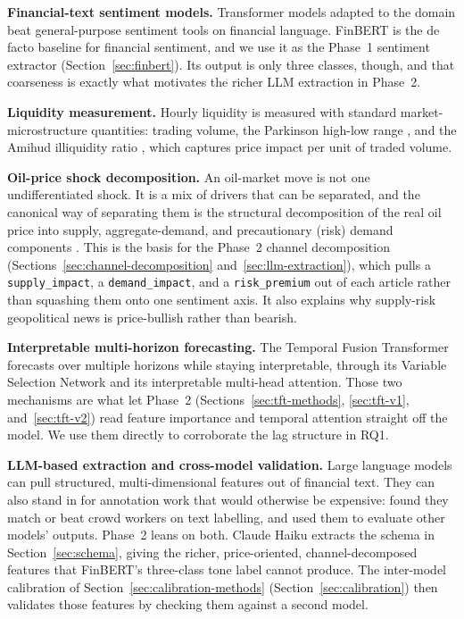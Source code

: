 \textbf{Financial-text sentiment models.} Transformer models adapted to the domain beat general-purpose sentiment tools on financial language. FinBERT \citep{araci2019} is the de facto baseline for financial sentiment, and we use it as the Phase~1 sentiment extractor (Section~\ref{sec:finbert}). Its output is only three classes, though, and that coarseness is exactly what motivates the richer LLM extraction in Phase~2.

\textbf{Liquidity measurement.} Hourly liquidity is measured with standard market-microstructure quantities: trading volume, the Parkinson high-low range \citep{parkinson1980}, and the Amihud illiquidity ratio \citep{amihud2002}, which captures price impact per unit of traded volume.

\textbf{Oil-price shock decomposition.} An oil-market move is not one undifferentiated shock. It is a mix of drivers that can be separated, and the canonical way of separating them is the structural decomposition of the real oil price into supply, aggregate-demand, and precautionary (risk) demand components \citep{kilian2009}. This is the basis for the Phase~2 channel decomposition (Sections~\ref{sec:channel-decomposition} and~\ref{sec:llm-extraction}), which pulls a \texttt{supply\_impact}, a \texttt{demand\_impact}, and a \texttt{risk\_premium} out of each article rather than squashing them onto one sentiment axis. It also explains why supply-risk geopolitical news is price-bullish rather than bearish.

\textbf{Interpretable multi-horizon forecasting.} The Temporal Fusion Transformer \citep{lim2021} forecasts over multiple horizons while staying interpretable, through its Variable Selection Network and its interpretable multi-head attention. Those two mechanisms are what let Phase~2 (Sections~\ref{sec:tft-methods}, \ref{sec:tft-v1}, and~\ref{sec:tft-v2}) read feature importance and temporal attention straight off the model. We use them directly to corroborate the lag structure in RQ1.

\textbf{LLM-based extraction and cross-model validation.} Large language models can pull structured, multi-dimensional features out of financial text. They can also stand in for annotation work that would otherwise be expensive: \citet{gilardi2023} found they match or beat crowd workers on text labelling, and \citet{zheng2023} used them to evaluate other models' outputs. Phase~2 leans on both. Claude Haiku extracts the schema in Section~\ref{sec:schema}, giving the richer, price-oriented, channel-decomposed features that FinBERT's three-class tone label cannot produce. The inter-model calibration of Section~\ref{sec:calibration-methods} (Section~\ref{sec:calibration}) then validates those features by checking them against a second model.
